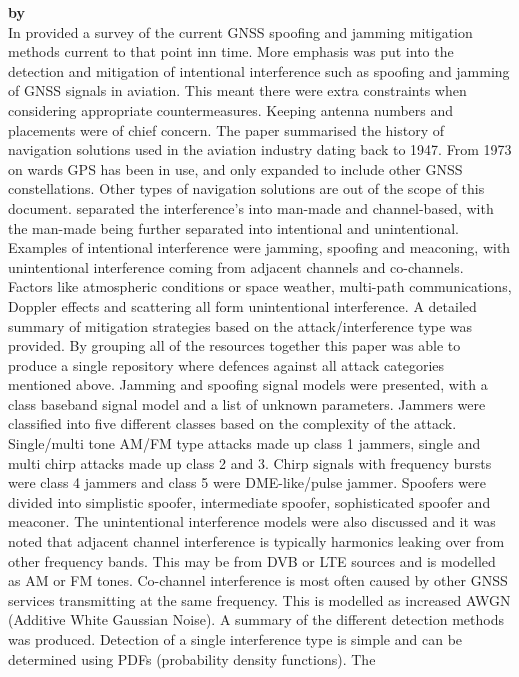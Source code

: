\textbf{\emph{} by \citeauthor{RN34}} \\
In \citeyear{RN34} \citeauthor{RN34} \cite{RN34} provided a survey of the current GNSS spoofing and jamming mitigation methods current to that point inn time. More
emphasis was put into the detection and mitigation of intentional interference such as spoofing and jamming of GNSS signals in aviation. This meant there were extra
constraints when considering appropriate countermeasures. Keeping antenna numbers and placements were of chief concern. The paper summarised the history of navigation
solutions used in the aviation industry dating back to 1947. From 1973 on wards GPS has been in use, and only expanded to include other GNSS constellations. Other types
of navigation solutions are out of the scope of this document.
\citeauthor{RN34} separated the interference's into man-made and channel-based, with the man-made being further separated into intentional and unintentional. Examples of
intentional interference were jamming, spoofing and meaconing, with unintentional interference coming from adjacent channels and co-channels. Factors like atmospheric
conditions or space weather, multi-path communications, Doppler effects and scattering all form unintentional interference. A detailed summary of mitigation strategies
based on the attack/interference type was provided. By grouping all of the resources together this paper was able to produce a single repository where defences against
all attack categories mentioned above. Jamming and spoofing signal models were presented, with a class baseband signal model and a list of unknown parameters. Jammers
were classified into five different classes based on the complexity of the attack. Single/multi tone AM/FM type attacks made up class 1 jammers, single and multi chirp
attacks made up class 2 and 3. Chirp signals with frequency bursts were class 4 jammers and class 5 were DME-like/pulse jammer. Spoofers were divided into simplistic
spoofer, intermediate spoofer, sophisticated spoofer and meaconer. The unintentional interference models were also discussed and it was noted that adjacent channel
interference is typically harmonics leaking over from other frequency bands. This may be from DVB or LTE sources and is modelled as AM or FM tones. Co-channel
interference is most often caused by other GNSS services transmitting at the same frequency. This is modelled as increased AWGN (Additive White Gaussian Noise). A summary
of the different detection methods was produced. Detection of a single interference type is simple and can be determined using PDFs (probability density functions). The
